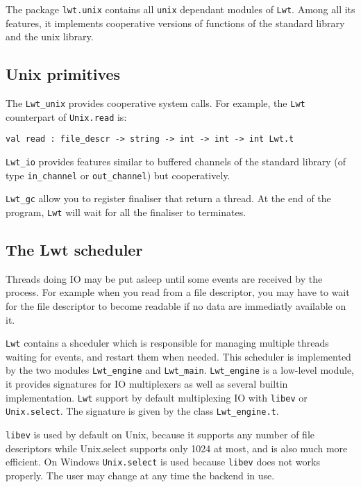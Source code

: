 The package {\tt lwt.unix} contains all {\tt unix} dependant
modules of {\tt Lwt}. Among all its features, it implements cooperative
versions of functions of the standard library and the unix library.



\subsection{ Unix primitives }

The {\tt Lwt\_unix} provides cooperative system calls. For example,
the {\tt Lwt} counterpart of {\tt Unix.read} is:



\lstset{language=[Objective]Caml}\begin{lstlisting}
val read : file_descr -> string -> int -> int -> int Lwt.t

\end{lstlisting}
{\tt Lwt\_io} provides features similar to buffered channels of
the standard library (of type {\tt in\_channel} or
{\tt out\_channel}) but cooperatively.



{\tt Lwt\_gc} allow you to register finaliser that return a
thread. At the end of the program, {\tt Lwt} will wait for all the
finaliser to terminates.



\subsection{ The Lwt scheduler }

Threads doing IO may be put asleep until some events are received by
the process. For example when you read from a file descriptor, you
may have to wait for the file descriptor to become readable if no
data are immediatly available on it.



{\tt Lwt} contains a shceduler which is responsible for managing
multiple threads waiting for events, and restart them when needed.
This scheduler is implemented by the two modules {\tt Lwt\_engine}
and {\tt Lwt\_main}. {\tt Lwt\_engine} is a low-level module, it
provides signatures for IO multiplexers as well as several builtin
implementation. {\tt Lwt} support by default multiplexing IO with
{\tt libev} or {\tt Unix.select}. The signature is given by the
class {\tt Lwt\_engine.t}.



{\tt libev} is used by default on Unix, because it supports any
number of file descriptors while Unix.select supports only 1024 at
most, and is also much more efficient. On Windows {\tt Unix.select}
is used because {\tt libev} does not works properly. The user may
change at any time the backend in use.



